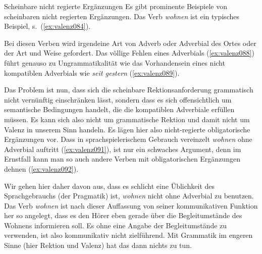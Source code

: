 \begin{Vertiefung}{Scheinbare nicht regierte Ergänzungen}
  \label{vert:nregerg}
\noindent Es gibt prominente Beispiele von scheinbaren nicht regierten Ergänzungen.
Das Verb \textit{wohnen} ist ein typisches Beispiel, s.\ (\ref{ex:valenz084}).

\begin{exe}
  \ex\label{ex:valenz084}
  \begin{xlist}
  \end{xlist}
\end{exe}

Bei diesen Verben wird irgendeine Art von Adverb oder Adverbial des Ortes oder der Art und Weise gefordert.
Das völlige Fehlen eines Adverbials (\ref{ex:valenz088}) führt genauso zu Ungrammatikalität wie das Vorhandensein eines nicht kompatiblen Adverbials wie \textit{seit gestern} (\ref{ex:valenz089}).

Das Problem ist nun, dass sich die scheinbare Rektionsanforderung grammatisch nicht vernünftig einschränken lässt, sondern dass es sich offensichtlich um semantische Bedingungen handelt, die die kompatiblen Adverbiale erfüllen müssen.
Es kann sich also nicht um grammatische Rektion und damit nicht um Valenz in unserem Sinn handeln.
Es lägen hier also nicht-regierte obligatorische Ergänzungen vor.
Dass in sprachspielerischem Gebrauch vereinzelt \textit{wohnen} ohne Adverbial auftritt (\ref{ex:valenz091}), ist nur ein schwaches Argument, denn im Ernstfall kann man so auch andere Verben mit obligatorischen Ergänzungen dehnen (\ref{ex:valenz092}).

\begin{exe}
  \ex\label{ex:valenz090}
  \begin{xlist}
  \end{xlist}
\end{exe}

Wir gehen hier daher davon aus, dass es schlicht eine Üblichkeit des Sprachgebrauchs (der Pragmatik) ist, \textit{wohnen} nicht ohne Adverbial zu benutzen.
Das Verb \textit{wohnen} ist nach dieser Auffassung von seiner kommunikativen Funktion her so angelegt, dass es den Hörer eben gerade über die Begleitumstände des Wohnens informieren soll.
Es ohne eine Angabe der Begleitumstände zu verwenden, ist also kommunikativ nicht zielführend.
Mit Grammatik im engeren Sinne (hier Rektion und Valenz) hat das dann nichts zu tun.

\end{Vertiefung}

